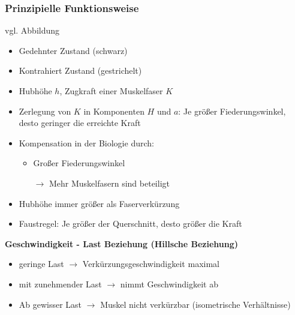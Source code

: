 \subsubsection{Prinzipielle Funktionsweise}
vgl. Abbildung
\begin{itemize}
	\item Gedehnter Zustand (schwarz)
	\item Kontrahiert Zustand (gestrichelt)
	\item Hubhöhe $h$, Zugkraft einer Muskelfaser $K$
	\item Zerlegung von $K$ in Komponenten $H$ und $a$: Je größer Fiederungswinkel, desto geringer die erreichte Kraft
	\item Kompensation in der Biologie durch:
	\begin{itemize}
		\item Großer Fiederungswinkel
		\item[$\rightarrow$] Mehr Muskelfasern sind beteiligt
	\end{itemize}
	\item Hubhöhe immer größer als Faserverkürzung
	\item Faustregel: Je größer der Querschnitt, desto größer die Kraft
\end{itemize}
\textbf{Geschwindigkeit - Last Beziehung (Hillsche Beziehung)}
\begin{itemize}
	\item geringe Last $\rightarrow$ Verkürzungsgeschwindigkeit maximal
	\item mit zunehmender Last $\rightarrow$ nimmt Geschwindigkeit ab
	\item Ab gewisser Last $\rightarrow$ Muskel nicht verkürzbar (isometrische Verhältnisse)
\end{itemize} 

